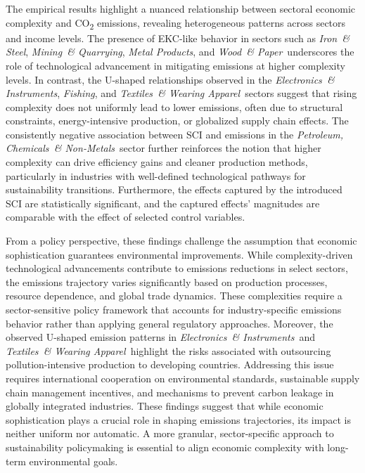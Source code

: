 \documentclass[10pt]{article}
\newcommand{\EL}{\textit{Electronics~\& Instruments}}
\newcommand{\FI}{\textit{Fishing}}
\newcommand{\IR}{\textit{Iron~\& Steel}}
\newcommand{\ME}{\textit{Metal Products}}
\newcommand{\MI}{\textit{Mining~\& Quarrying}}
\newcommand{\PE}{\textit{Petroleum, Chemicals~\& Non-Metals}}
\newcommand{\TE}{\textit{Textiles~\& Wearing Apparel}}
\newcommand{\WO}{\textit{Wood~\& Paper}}
\begin{document}
The empirical results highlight a nuanced relationship between sectoral economic complexity and CO\textsubscript{2} emissions, revealing heterogeneous patterns across sectors and income levels. The presence of EKC-like behavior in sectors such as \IR, \MI, \ME, and \WO\ underscores the role of technological advancement in mitigating emissions at higher complexity levels. In contrast, the U-shaped relationships observed in the \EL, \FI, and \TE\ sectors suggest that rising complexity does not uniformly lead to lower emissions, often due to structural constraints, energy-intensive production, or globalized supply chain effects. The consistently negative association between SCI and emissions in the \PE\ sector further reinforces the notion that higher complexity can drive efficiency gains and cleaner production methods, particularly in industries with well-defined technological pathways for sustainability transitions. Furthermore, the effects captured by the introduced SCI are statistically significant, and the captured effects' magnitudes are comparable with the effect of selected control variables.

From a policy perspective, these findings challenge the assumption that economic sophistication guarantees environmental improvements. While complexity-driven technological advancements contribute to emissions reductions in select sectors, the emissions trajectory varies significantly based on production processes, resource dependence, and global trade dynamics. These complexities require a sector-sensitive policy framework that accounts for industry-specific emissions behavior rather than applying general regulatory approaches. Moreover, the observed U-shaped emission patterns in \EL\ and \TE\ highlight the risks associated with outsourcing pollution-intensive production to developing countries. Addressing this issue requires international cooperation on environmental standards, sustainable supply chain management incentives, and mechanisms to prevent carbon leakage in globally integrated industries. These findings suggest that while economic sophistication plays a crucial role in shaping emissions trajectories, its impact is neither uniform nor automatic. A more granular, sector-specific approach to sustainability policymaking is essential to align economic complexity with long-term environmental goals.
\end{document}
